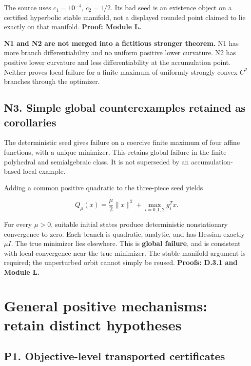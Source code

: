 The source uses \(c_1=10^{-4}\), \(c_2=1/2\). Its bad seed is an existence object on a certified hyperbolic stable manifold, not a displayed rounded point claimed to lie exactly on that manifold. \textbf{Proof: Module L.}

\textbf{N1 and N2 are not merged into a fictitious stronger theorem.} N1 has more branch differentiability and no uniform positive lower curvature. N2 has positive lower curvature and less differentiability at the accumulation point. Neither proves local failure for a finite maximum of uniformly strongly convex \(C^2\) branches through the optimizer.

\subsection{N3. Simple global counterexamples retained as corollaries}\label{n3.-simple-global-counterexamples-retained-as-corollaries}

The deterministic seed gives failure on a coercive finite maximum of four affine functions, with a unique minimizer. This retains global failure in the finite polyhedral and semialgebraic class. It is not superseded by an accumulation-based local example.

Adding a common positive quadratic to the three-piece seed yields

\[
 Q_\mu(x)=\frac\mu2\|x\|^2+\max_{i=0,1,2}g_i^Tx.
\]

For every \(\mu>0\), suitable initial states produce deterministic nonstationary convergence to zero. Each branch is quadratic, analytic, and has Hessian exactly \(\mu I\). The true minimizer lies elsewhere. This is \textbf{global failure}, and is consistent with local convergence near the true minimizer. The stable-manifold argument is required; the unperturbed orbit cannot simply be reused. \textbf{Proofs: D.3.1 and Module L.}

\section{General positive mechanisms: retain distinct hypotheses}\label{general-positive-mechanisms-retain-distinct-hypotheses}

\subsection{P1. Objective-level transported certificates}\label{p1.-objective-level-transported-certificates}

